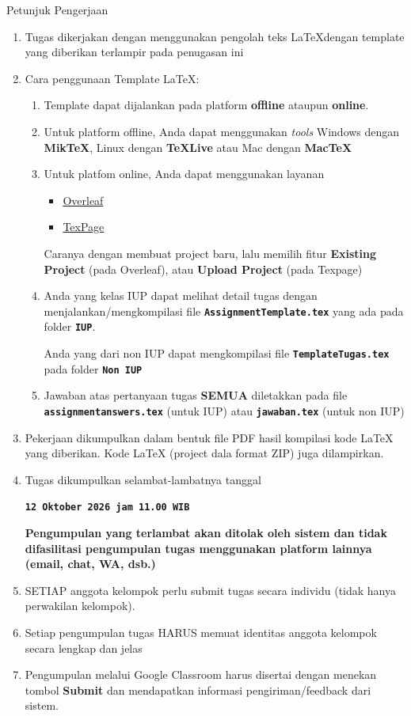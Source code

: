 \documentclass[a4paper,11pt]{article}
\newcommand{\tekskode}[1]{{\bf\large\texttt{#1}}}
\begin{document}
\begin{warnbox}{Petunjuk Pengerjaan}
\begin{enumerate}
    \itemsep0em
    \item Tugas dikerjakan dengan menggunakan pengolah teks \LaTeX dengan template yang diberikan terlampir pada penugasan ini
    \item Cara penggunaan Template \LaTeX:
    \begin{enumerate}
    \itemsep0em
     \item Template dapat dijalankan pada platform \textbf{offline} ataupun \textbf{online}.
     \item Untuk platform offline, Anda dapat menggunakan \textit{tools}  Windows dengan \textbf{MikTeX}, Linux dengan \textbf{TeXLive} atau Mac dengan \textbf{MacTeX}
     \item Untuk platfom online, Anda dapat menggunakan layanan 
     \begin{itemize}
         \item \href{https://www.overleaf.com/}{Overleaf}
         \item \href{https://www.texpage.com/}{TexPage}
     \end{itemize}
     Caranya dengan membuat project baru, lalu memilih fitur \textbf{Existing Project} (pada Overleaf), atau \textbf{Upload Project} (pada Texpage)
     \item Anda yang kelas IUP dapat melihat detail tugas dengan menjalankan/mengkompilasi file \tekskode{AssignmentTemplate.tex} yang ada pada folder \tekskode{IUP}. 
     
     Anda yang dari non IUP dapat mengkompilasi file \tekskode{TemplateTugas.tex} pada folder \tekskode{Non IUP}
     \item Jawaban atas pertanyaan tugas \textbf{SEMUA} diletakkan pada file \tekskode{assignmentanswers.tex} (untuk IUP) atau \tekskode{jawaban.tex} (untuk non IUP)
    \end{enumerate}
     \item Pekerjaan dikumpulkan dalam bentuk file PDF hasil kompilasi kode LaTeX yang diberikan. Kode LaTeX (project dala format ZIP) juga dilampirkan.
     \item Tugas dikumpulkan selambat-lambatnya tanggal 
     \begin{tcolorbox}
     \center
     \tekskode{12 Oktober 2026 jam 11.00 WIB}    
     \end{tcolorbox}
     \textbf{Pengumpulan yang terlambat akan ditolak oleh sistem dan tidak difasilitasi pengumpulan tugas menggunakan platform lainnya (email, chat, WA, dsb.)}
     \item SETIAP anggota kelompok perlu submit tugas secara individu (tidak hanya perwakilan kelompok).
     \item Setiap pengumpulan tugas HARUS memuat identitas anggota kelompok secara lengkap dan jelas
     \item Pengumpulan melalui Google Classroom harus disertai dengan menekan tombol \textbf{Submit} dan mendapatkan informasi pengiriman/feedback dari sistem.
\end{enumerate}
\end{warnbox}
\end{document}
